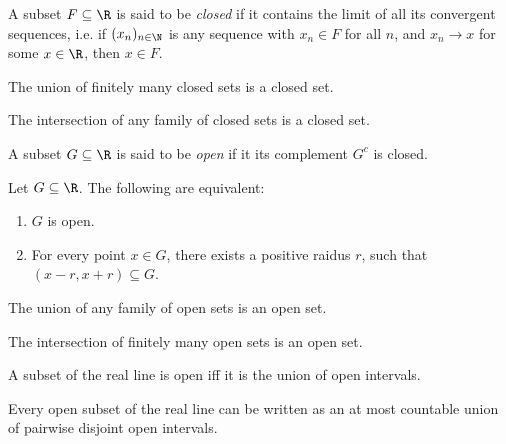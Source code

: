 \documentclass{article}
\begin{document}
\begin{definition}
    A subset $F\subseteq\R$ is said to be \emph{closed} if it contains the limit of all
    its convergent sequences, i.e. if $(x_n)_{n\in\N}$ is any sequence with $x_n\in F$
    for all $n$, and $x_n\to x$ for some $x\in\R$, then $x\in F$.
\end{definition}

\begin{proposition}[Notes 2.2]
    The union of finitely many closed sets is a closed set.
\end{proposition}

\begin{proposition}[Notes 2.4]
    The intersection of any family of closed sets is a closed set.
\end{proposition}

\begin{definition}
    A subset $G\subseteq\R$ is said to be \emph{open} if it its complement $G^c$ is closed.
\end{definition}

\begin{proposition}[Notes 2.6]
    Let $G\subseteq\R$. The following are equivalent:
    \begin{enumerate}
        \item $G$ is open.
        \item For every point $x\in G$, there exists a positive raidus $r$, such that
              $(x-r,x+r)\subseteq G$.
    \end{enumerate}
\end{proposition}

\begin{proposition}[Notes 2.8]
    The union of any family of open sets is an open set.
\end{proposition}

\begin{proposition}[Notes 2.9]
    The intersection of finitely many open sets is an open set.
\end{proposition}

\begin{theorem}[Notes 2.10]
    A subset of the real line is open iff it is the union of open intervals.
\end{theorem}

\begin{theorem}[Notes 2.11]
    Every open subset of the real line can be written as an at most countable union
    of pairwise disjoint open intervals.
\end{theorem}
\end{document}
